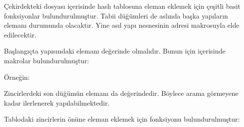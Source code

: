 \documentclass[a4paper,10pt,turkish]{sphinxmanual}
\begin{document}
\sphinxAtStartPar
Çekirdekteki  dosyası içerisinde hash tablosuna eleman eklemek için çeşitli basit
fonksiyonlar bulundurulmuştur. Tabii  düğümleri de aslında başka yapıların
elemanı durumunda olacaktır. Yine asıl yapı nesnesinin adresi  makrosuyla
elde edilecektir.

\sphinxAtStartPar
Başlangıçta  yapısındaki  elemanı  değerinde olmalıdır.
Bunun için  içerisinde makrolar bulundurulmuştur:

\begin{sphinxVerbatim}[commandchars=\\\{\}]
\end{sphinxVerbatim}

\sphinxAtStartPar
Örneğin:

\begin{sphinxVerbatim}[commandchars=\\\{\}]
\PYG{p}{[}\PYG{p}{]}
\end{sphinxVerbatim}

\sphinxAtStartPar
Zincirlerdeki son düğümün  elemanı da  değerindedir. Böylece arama
 görmeyene kadar ilerlenerek yapılabilmektedir.

\sphinxAtStartPar
Tablodaki zincirlerin önüne eleman eklemek için  fonksiyonu
bulundurulmuştur:
\end{document}
